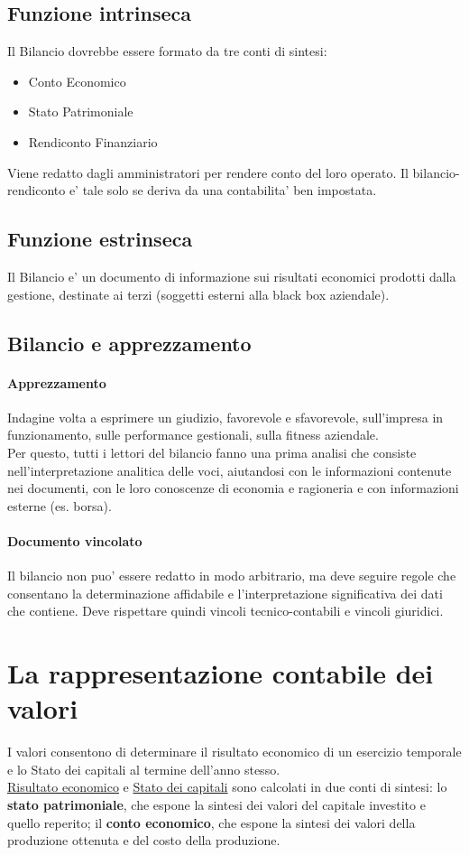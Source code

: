 \documentclass{report}
\begin{document}
	\subsection{Funzione intrinseca}
	Il Bilancio dovrebbe essere formato da tre conti di sintesi:
	\begin{itemize}
		\item Conto Economico
		\item Stato Patrimoniale
		\item Rendiconto Finanziario
	\end{itemize}
	Viene redatto dagli amministratori per rendere conto del loro operato. Il bilancio-rendiconto e' tale solo se deriva da una contabilita' ben impostata.
	\subsection{Funzione estrinseca}
	Il Bilancio e' un documento di informazione sui risultati economici prodotti dalla gestione, destinate ai terzi (soggetti esterni alla black box aziendale).
	\subsection{Bilancio e apprezzamento}
	\paragraph{Apprezzamento} Indagine volta a esprimere un giudizio, favorevole e sfavorevole, sull'impresa in funzionamento, sulle performance gestionali, sulla fitness aziendale.
	\medskip \\Per questo, tutti i lettori del bilancio fanno una prima analisi che consiste nell'interpretazione analitica delle voci, aiutandosi con le informazioni contenute nei documenti, con le loro conoscenze di economia e ragioneria e con informazioni esterne (es. borsa).
	\paragraph{Documento vincolato} Il bilancio non puo' essere redatto in modo arbitrario, ma deve seguire regole che consentano la determinazione affidabile e l'interpretazione significativa dei dati che contiene. Deve rispettare quindi vincoli tecnico-contabili e vincoli giuridici.
	\section{La rappresentazione contabile dei valori}
	I valori consentono di determinare il risultato economico di un esercizio temporale e lo Stato dei capitali al termine dell'anno stesso.\medskip \\\underline{Risultato economico} e \underline{Stato dei capitali} sono calcolati in due conti di sintesi: lo \textbf{stato patrimoniale}, che espone la sintesi dei valori del capitale investito e quello reperito; il \textbf{conto economico}, che espone la sintesi dei valori della produzione ottenuta e del costo della produzione.
\end{document}
